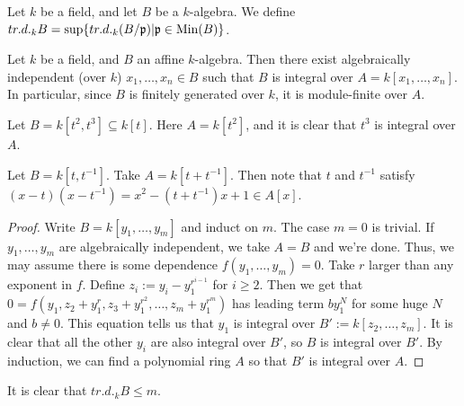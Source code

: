  \begin{definition}
   Let $k$ be a field, and let $B$ be a $k$-algebra. We define $tr.d._k B = \sup
   \{tr.d._k (B/\mathfrak{p})|\mathfrak{p}\in \operatorname{Min}(B)\}$.
 \end{definition}
 \begin{theorem}
   Let $k$ be a field, and $B$ an affine $k$-algebra. Then there exist algebraically
   independent (over $k$) $x_1,\dots, x_n\in B$ such that $B$ is integral over
   $A=k[x_1,\dots, x_n]$. In particular, since $B$ is finitely generated over $k$, it is
   module-finite over $A$.
 \end{theorem}
 \begin{example}
   Let $B=k[t^2,t^3]\subseteq k[t]$. Here $A=k[t^2]$, and it is clear that $t^3$ is
   integral over $A$.
 \end{example}
 \begin{example}
   Let $B=k[t,t^{-1}]$. Take $A=k[t+t^{-1}]$. Then note that $t$ and $t^{-1}$ satisfy
   $(x-t)(x-t^{-1}) = x^2-(t+t^{-1})x+1\in A[x]$.
 \end{example}
 \begin{proof}
   Write $B=k[y_1,\dots, y_m]$ and induct on $m$. The case $m=0$ is trivial. If
   $y_1,\dots, y_m$ are algebraically independent, we take $A=B$ and we're done. Thus, we
   may assume there is some dependence $f(y_1,\dots, y_m)=0$. Take $r$ larger than any
   exponent in $f$. Define $z_i:=y_i-y_1^{r^{i-1}}$ for $i\ge 2$. Then we get that
   $0=f(y_1,z_2+y_1^{r}, z_3+y_1^{r^2}, \dots, z_m + y_1^{r^m})$ has leading term
   $by_1^N$ for some huge $N$ and $b\neq 0$. This equation tells us that $y_1$ is
   integral over $B':=k[z_2,\dots, z_m]$. It is clear that all the other $y_i$ are also
   integral over $B'$, so $B$ is integral over $B'$. By induction, we can find a
   polynomial ring $A$ so that $B'$ is integral over $A$.
 \end{proof}
 It is clear that $tr.d._k B\le m$.
